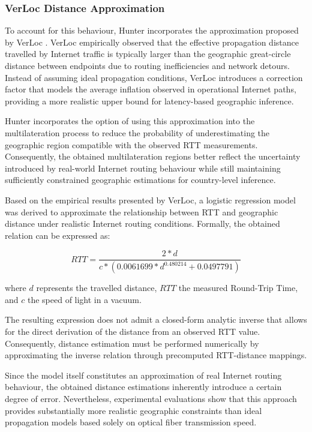 \subsubsection{VerLoc Distance Approximation}
\label{sc:hunter_multilateration_distance_estimation_verloc}

To account for this behaviour, Hunter incorporates the approximation proposed by VerLoc \cite{Kohls2022VerLoc:Systems}. VerLoc empirically observed that the effective propagation distance travelled by Internet traffic is typically larger than the geographic great-circle distance between endpoints due to routing inefficiencies and network detours. Instead of assuming ideal propagation conditions, VerLoc introduces a correction factor that models the average inflation observed in operational Internet paths, providing a more realistic upper bound for latency-based geographic inference.

Hunter incorporates the option of using this approximation into the multilateration process to reduce the probability of underestimating the geographic region compatible with the observed RTT measurements. Consequently, the obtained multilateration regions better reflect the uncertainty introduced by real-world Internet routing behaviour while still maintaining sufficiently constrained geographic estimations for country-level inference.

Based on the empirical results presented by VerLoc, a logistic regression model was derived to approximate the relationship between RTT and geographic distance under realistic Internet routing conditions. Formally, the obtained relation can be expressed as:

\begin{equation*}
    RTT = \frac{2*d}{c*(0.0061699 * d^{0.480214} + 0.0497791)}
\end{equation*}

where $d$ represents the travelled distance, $RTT$ the measured Round-Trip Time, and $c$ the speed of light in a vacuum.

The resulting expression does not admit a closed-form analytic inverse that allows for the direct derivation of the distance from an observed RTT value. Consequently, distance estimation must be performed numerically by approximating the inverse relation through precomputed RTT-distance mappings.

Since the model itself constitutes an approximation of real Internet routing behaviour, the obtained distance estimations inherently introduce a certain degree of error. Nevertheless, experimental evaluations show that this approach provides substantially more realistic geographic constraints than ideal propagation models based solely on optical fiber transmission speed.

